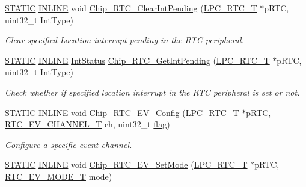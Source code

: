 \begin{DoxyCompactItemize}
\hyperlink{group___l_p_c___types___public___macros_ga10b2d890d871e1489bb02b7e70d9bdfb}{S\+T\+A\+T\+IC} \hyperlink{spifi__18xx__43xx_8h_a2eb6f9e0395b47b8d5e3eeae4fe0c116}{I\+N\+L\+I\+NE} void \hyperlink{group___r_t_c__18_x_x__43_x_x_gaa43865e87cf61d579a4ee52a307b3e30}{Chip\+\_\+\+R\+T\+C\+\_\+\+Clear\+Int\+Pending} (\hyperlink{struct_l_p_c___r_t_c___t}{L\+P\+C\+\_\+\+R\+T\+C\+\_\+T} $\ast$p\+R\+TC, uint32\+\_\+t Int\+Type)
\begin{DoxyCompactList}\small\item\em Clear specified Location interrupt pending in the R\+TC peripheral. \end{DoxyCompactList}\item 
\hyperlink{group___l_p_c___types___public___macros_ga10b2d890d871e1489bb02b7e70d9bdfb}{S\+T\+A\+T\+IC} \hyperlink{spifi__18xx__43xx_8h_a2eb6f9e0395b47b8d5e3eeae4fe0c116}{I\+N\+L\+I\+NE} \hyperlink{group___l_p_c___types___public___types_gab7d263072f745b4f3913fb0afc434c4e}{Int\+Status} \hyperlink{group___r_t_c__18_x_x__43_x_x_gaab21524984ac344d4f508d2dfd6c5098}{Chip\+\_\+\+R\+T\+C\+\_\+\+Get\+Int\+Pending} (\hyperlink{struct_l_p_c___r_t_c___t}{L\+P\+C\+\_\+\+R\+T\+C\+\_\+T} $\ast$p\+R\+TC, uint32\+\_\+t Int\+Type)
\begin{DoxyCompactList}\small\item\em Check whether if specified location interrupt in the R\+TC peripheral is set or not. \end{DoxyCompactList}\item 
\hyperlink{group___l_p_c___types___public___macros_ga10b2d890d871e1489bb02b7e70d9bdfb}{S\+T\+A\+T\+IC} \hyperlink{spifi__18xx__43xx_8h_a2eb6f9e0395b47b8d5e3eeae4fe0c116}{I\+N\+L\+I\+NE} void \hyperlink{group___r_t_c__18_x_x__43_x_x_ga522a16f061cbc11f00e2a6681da07ad2}{Chip\+\_\+\+R\+T\+C\+\_\+\+E\+V\+\_\+\+Config} (\hyperlink{struct_l_p_c___r_t_c___t}{L\+P\+C\+\_\+\+R\+T\+C\+\_\+T} $\ast$p\+R\+TC, \hyperlink{group___r_t_c__18_x_x__43_x_x_gaac7e8d7c66860037449fdde1bdfb657b}{R\+T\+C\+\_\+\+E\+V\+\_\+\+C\+H\+A\+N\+N\+E\+L\+\_\+T} ch, uint32\+\_\+t \hyperlink{sdio__18xx__43xx_8c_a8fac2498fe5bd106b35d43af5bc91f6f}{flag})
\begin{DoxyCompactList}\small\item\em Configure a specific event channel. \end{DoxyCompactList}\item 
\hyperlink{group___l_p_c___types___public___macros_ga10b2d890d871e1489bb02b7e70d9bdfb}{S\+T\+A\+T\+IC} \hyperlink{spifi__18xx__43xx_8h_a2eb6f9e0395b47b8d5e3eeae4fe0c116}{I\+N\+L\+I\+NE} void \hyperlink{group___r_t_c__18_x_x__43_x_x_ga6b1011cc2afb90d24e7b63eccea42564}{Chip\+\_\+\+R\+T\+C\+\_\+\+E\+V\+\_\+\+Set\+Mode} (\hyperlink{struct_l_p_c___r_t_c___t}{L\+P\+C\+\_\+\+R\+T\+C\+\_\+T} $\ast$p\+R\+TC, \hyperlink{group___r_t_c__18_x_x__43_x_x_gabcbfff4a7d52791dc0b1cdcb078a2a05}{R\+T\+C\+\_\+\+E\+V\+\_\+\+M\+O\+D\+E\+\_\+T} mode)

\end{DoxyCompactItemize}
